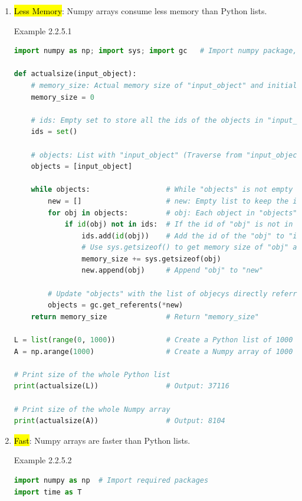 \documentclass{book}
\begin{document}
\begin{enumerate}
    \item \hl{Less Memory}: Numpy arrays consume less memory than Python lists.
    \begin{egBox}{Example 2.2.5.1}{}
        \begin{lstlisting}[language=Python, basicstyle=\ttfamily\small, keywordstyle=\color{blue}, commentstyle=\color{forestgreen}, stringstyle=\color{red}, showstringspaces=false]
import numpy as np; import sys; import gc   # Import numpy package, sys and gc module

def actualsize(input_object):
    # memory_size: Actual memory size of "input_object" and initialize it to 0
    memory_size = 0 

    # ids: Empty set to store all the ids of the objects in "input_object"
    ids = set()

    # objects: List with "input_object" (Traverse from "input_object" to the end)
    objects = [input_object]

    while objects:                  # While "objects" is not empty
        new = []                    # new: Empty list to keep the items linked by "objects"
        for obj in objects:         # obj: Each object in "objects"
            if id(obj) not in ids:  # If the id of "obj" is not in "ids"
                ids.add(id(obj))    # Add the id of the "obj" to "ids"
                # Use sys.getsizeof() to get memory size of "obj" and add it to "memory_size"
                memory_size += sys.getsizeof(obj) 
                new.append(obj)     # Append "obj" to "new"
        
        # Update "objects" with the list of objecys directly referred to by *new        
        objects = gc.get_referents(*new)
    return memory_size              # Return "memory_size"

L = list(range(0, 1000))            # Create a Python list of 1000 elements
A = np.arange(1000)                 # Create a Numpy array of 1000 elements

# Print size of the whole Python list
print(actualsize(L))                # Output: 37116

# Print size of the whole Numpy array
print(actualsize(A))                # Output: 8104
        \end{lstlisting}
    \end{egBox}
    \item \hl{Fast}: Numpy arrays are faster than Python lists.
    \begin{egBox}{Example 2.2.5.2}{}
        \begin{lstlisting}[language=Python, basicstyle=\ttfamily\small, keywordstyle=\color{blue}, commentstyle=\color{forestgreen}, stringstyle=\color{red}, showstringspaces=false]
import numpy as np  # Import required packages
import time as T


\end{lstlisting}
\end{egBox}
\end{enumerate}
\end{document}
